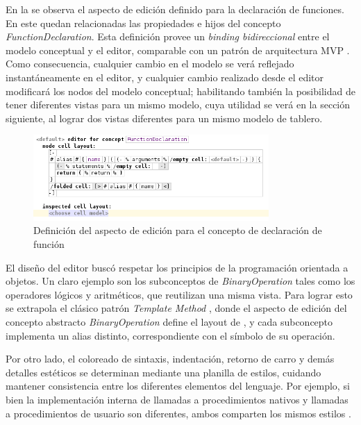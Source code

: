 En la  se observa el aspecto de edición definido para la declaración de funciones. En este quedan relacionadas las propiedades e hijos del concepto \textit{FunctionDeclaration}. Esta definición provee un \textit{binding bidireccional} entre el modelo conceptual y el editor, comparable con un patrón de arquitectura MVP  . Como consecuencia, cualquier cambio en el modelo se verá reflejado instantáneamente en el editor, y cualquier cambio realizado desde el editor modificará los nodos del modelo conceptual; habilitando también la posibilidad de tener diferentes vistas para un mismo modelo, cuya utilidad se verá en la sección siguiente, al lograr dos vistas diferentes para un mismo modelo de tablero.


  \begin{figure}[h]
  \centering
  \includegraphics[width=0.80\textwidth]{assets/function_declaration_editor}
  \caption{Definición del aspecto de edición para el concepto de declaración de función}
  \label{fig:function_declaration_editor}
  \end{figure}



El diseño del editor buscó respetar los principios de la programación orientada a objetos. Un claro ejemplo son los subconceptos de \textit{BinaryOperation} tales como los operadores lógicos y aritméticos, que reutilizan una misma vista. Para lograr esto se extrapola el clásico patrón \textit{Template Method} \cite{Gamma}, donde el aspecto de edición del concepto abstracto \textit{BinaryOperation} define el layout de , y cada subconcepto implementa un alias distinto, correspondiente con el símbolo de su operación.



\centertree{
  [BinaryOperation
    [{Plus(alias='+')}]
    [{Div(alias='/')}]
    [...]
  ]  
}

Por otro lado, el coloreado de sintaxis, indentación, retorno de carro y demás detalles estéticos se determinan mediante una planilla de estilos, cuidando mantener consistencia entre los diferentes elementos del lenguaje. Por ejemplo, si bien la implementación interna de llamadas a procedimientos nativos y llamadas a procedimientos de usuario son diferentes, ambos comparten los mismos estilos .

